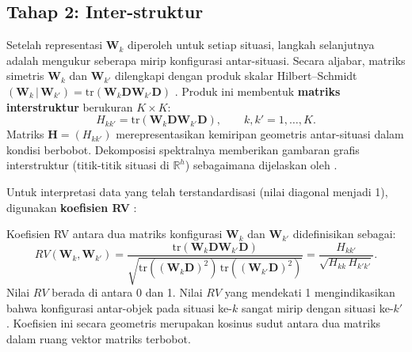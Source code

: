 \subsection{\normalsize Tahap 2: Inter-struktur}

Setelah representasi $\mathbf{W}_k$ diperoleh untuk setiap situasi, langkah selanjutnya adalah mengukur seberapa mirip konfigurasi antar-situasi. Secara aljabar, matriks simetris $\mathbf{W}_k$ dan $\mathbf{W}_{k'}$ dilengkapi dengan produk skalar Hilbert--Schmidt $(\mathbf{W}_k\,|\,\mathbf{W}_{k'}) = \mathrm{tr}(\mathbf{W}_k \mathbf{D} \mathbf{W}_{k'} \mathbf{D})$ \citep{lavit94,oliveira2024}. Produk ini membentuk \textbf{matriks interstruktur} berukuran $K \times K$:
\begin{equation}\label{eq:interstructure_H}
  H_{kk'} = \mathrm{tr}(\mathbf{W}_k \mathbf{D} \mathbf{W}_{k'} \mathbf{D}), \qquad k,k' = 1,\ldots,K.
\end{equation}
Matriks $\mathbf{H}=(H_{kk'})$ merepresentasikan kemiripan geometris antar-situasi dalam kondisi berbobot. Dekomposisi spektralnya memberikan gambaran grafis interstruktur (titik-titik situasi di $\mathbb{R}^h$) sebagaimana dijelaskan oleh \citet{lavit94}.

Untuk interpretasi data yang telah terstandardisasi (nilai diagonal menjadi 1), digunakan \textbf{koefisien RV} \citep{escoufier1973}:
\begin{definition}[Koefisien RV]
  Koefisien RV antara dua matriks konfigurasi $\mathbf{W}_k$ dan $\mathbf{W}_{k'}$ didefinisikan sebagai:
  \begin{equation}\label{eq:rv}
    RV(\mathbf{W}_k, \mathbf{W}_{k'}) = \frac{\mathrm{tr}(\mathbf{W}_k \mathbf{D} \mathbf{W}_{k'} \mathbf{D})}{\sqrt{\mathrm{tr}((\mathbf{W}_k \mathbf{D})^2) \, \mathrm{tr}((\mathbf{W}_{k'} \mathbf{D})^2)}}
    = \frac{H_{kk'}}{\sqrt{H_{kk}\,H_{k'k'}}}.
  \end{equation}
  Nilai $RV$ berada di antara 0 dan 1. Nilai $RV$ yang mendekati 1 mengindikasikan bahwa konfigurasi antar-objek pada situasi ke-$k$ sangat mirip dengan situasi ke-$k'$. Koefisien ini secara geometris merupakan kosinus sudut antara dua matriks dalam ruang vektor matriks terbobot.
\end{definition}

